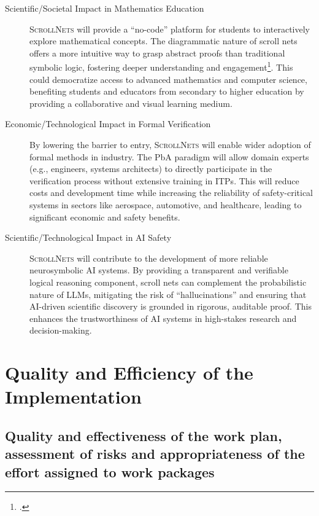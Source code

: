 \documentclass[11pt]{msca-pf}
\newcommand{\proj}{\small\textsc{ScrollNets}}
\begin{document}
\begin{description}
    \item[Scientific/Societal Impact in Mathematics Education] {\proj} will provide a ``no-code''
    platform for students to interactively explore mathematical concepts. The diagrammatic nature of
    scroll nets offers a more intuitive way to grasp abstract proofs than traditional symbolic
    logic, fostering deeper understanding and engagement\footcite{minhResearchReportProof2024}. This
    could democratize access to advanced mathematics and computer science, benefiting students and
    educators from secondary to higher education by providing a collaborative and visual learning
    medium.

    \item[Economic/Technological Impact in Formal Verification] By lowering the barrier to entry,
    {\proj} will enable wider adoption of formal methods in industry. The PbA paradigm will allow
    domain experts (e.g., engineers, systems architects) to directly participate in the verification
    process without extensive training in ITPs. This will reduce costs and development time while
    increasing the reliability of safety-critical systems in sectors like aerospace, automotive, and
    healthcare, leading to significant economic and safety benefits.

    \item[Scientific/Technological Impact in AI Safety] {\proj} will contribute to the development
    of more reliable neurosymbolic AI systems. By providing a transparent and verifiable logical
    reasoning component, scroll nets can complement the probabilistic nature of LLMs, mitigating the
    risk of ``hallucinations'' and ensuring that AI-driven scientific discovery is grounded in
    rigorous, auditable proof. This enhances the trustworthiness of AI systems in high-stakes
    research and decision-making.
\end{description}

 

\section{Quality and Efficiency of the Implementation
            }
\label{sc:implementation}

\subsection{Quality and effectiveness of the work plan, assessment of risks and
    appropriateness of the effort assigned to work packages}
\label{ssc:implementation:workplan}
\end{document}
